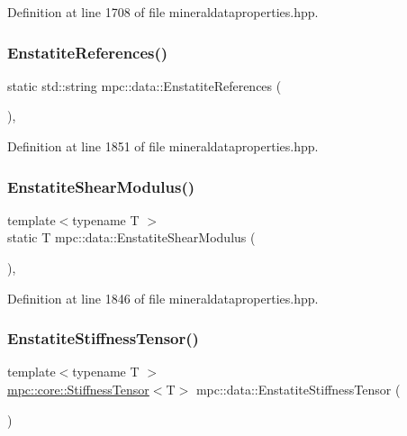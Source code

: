 Definition at line 1708 of file mineraldataproperties.\+hpp.

\mbox{\label{namespacempc_1_1data_aec2c8a31edd1909ddcd56cf97aa7eedc}} 
\subsubsection{\texorpdfstring{Enstatite\+References()}{EnstatiteReferences()}}
{\footnotesize\ttfamily static std\+::string mpc\+::data\+::\+Enstatite\+References (\begin{DoxyParamCaption}{ }\end{DoxyParamCaption})\hspace{0.3cm}{\ttfamily [inline]}, {\ttfamily [static]}}



Definition at line 1851 of file mineraldataproperties.\+hpp.

\mbox{\label{namespacempc_1_1data_a8f0180d14be94290170f12b5f4f688bd}} 
\subsubsection{\texorpdfstring{Enstatite\+Shear\+Modulus()}{EnstatiteShearModulus()}}
{\footnotesize\ttfamily template$<$typename T $>$ \\
static T mpc\+::data\+::\+Enstatite\+Shear\+Modulus (\begin{DoxyParamCaption}{ }\end{DoxyParamCaption})\hspace{0.3cm}{\ttfamily [inline]}, {\ttfamily [static]}}



Definition at line 1846 of file mineraldataproperties.\+hpp.

\mbox{\label{namespacempc_1_1data_a4051f002105bbe1972265c3d1c30773c}} 
\subsubsection{\texorpdfstring{Enstatite\+Stiffness\+Tensor()}{EnstatiteStiffnessTensor()}}
{\footnotesize\ttfamily template$<$typename T $>$ \\
\mbox{\hyperlink{structmpc_1_1core_1_1_stiffness_tensor}{mpc\+::core\+::\+Stiffness\+Tensor}}$<$T$>$ mpc\+::data\+::\+Enstatite\+Stiffness\+Tensor (\begin{DoxyParamCaption}{ }\end{DoxyParamCaption})}




